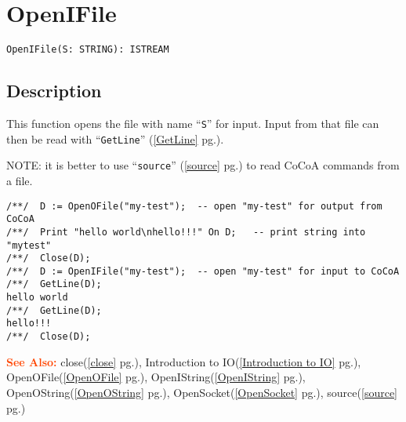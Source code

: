 \documentclass[a4paper]{mybook}
\newenvironment{command}{}{} %
\newcommand\SeeAlso{\par\textcolor{OrangeRed}{\textbf{\large See Also: }}}
\begin{document}
\section{OpenIFile}
\label{OpenIFile}
\begin{command} %


\begin{Verbatim}[label=syntax, rulecolor=\color{MidnightBlue},
frame=single]
OpenIFile(S: STRING): ISTREAM
\end{Verbatim}


\subsection*{Description}

This function opens the file with name ``\verb&S&'' for input.
Input from that file can then be read with ``\verb&GetLine&'' (\ref{GetLine} pg.\pageref{GetLine}).
\par 
NOTE: it is better to use ``\verb&source&'' (\ref{source} pg.\pageref{source}) to read CoCoA commands from a file.
\begin{Verbatim}[label=example, rulecolor=\color{PineGreen}, frame=single]
/**/  D := OpenOFile("my-test");  -- open "my-test" for output from CoCoA
/**/  Print "hello world\nhello!!!" On D;   -- print string into "mytest"
/**/  Close(D);
/**/  D := OpenIFile("my-test");  -- open "my-test" for input to CoCoA
/**/  GetLine(D);
hello world
/**/  GetLine(D);
hello!!!
/**/  Close(D);
\end{Verbatim}


\SeeAlso %
  close(\ref{close} pg.\pageref{close}), 
    Introduction to IO(\ref{Introduction to IO} pg.\pageref{Introduction to IO}), 
    OpenOFile(\ref{OpenOFile} pg.\pageref{OpenOFile}), 
    OpenIString(\ref{OpenIString} pg.\pageref{OpenIString}), 
    OpenOString(\ref{OpenOString} pg.\pageref{OpenOString}), 
    OpenSocket(\ref{OpenSocket} pg.\pageref{OpenSocket}), 
    source(\ref{source} pg.\pageref{source})
\end{command} %
\end{document}
